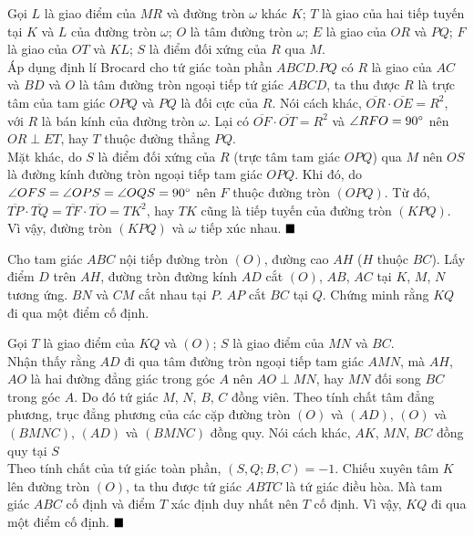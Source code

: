 \documentclass{article} %
\newenvironment{solution}[1][Lời giải]{%
  \proof[\faPenNib \hspace{0.2cm} \ttfamily \scshape \large #1]%
}{\(\hfill \blacksquare\){\parfillskip0pt\par}}
\begin{document}
        \begin{solution}
            Gọi \(L\) là giao điểm của \(MR\) và đường tròn \(\omega\) khác \(K\); \(T\) là giao của hai tiếp tuyến tại \(K\) và \(L\) của đường tròn \(\omega\); \(O\) là tâm đường tròn \(\omega\); \(E\) là giao của \(OR\) và \(PQ\); \(F\) là giao của \(OT\) và \(KL\); \(S\) là điểm đối xứng của \(R\) qua \(M\).\\
            Áp dụng định lí Brocard cho tứ giác toàn phần \(ABCD.PQ\) có \(R\) là giao của \(AC\) và \(BD\) và \(O\) là tâm đường tròn ngoại tiếp tứ giác \(ABCD\), ta thu được \(R\) là trực tâm của tam giác \(OPQ\) và \(PQ\) là đối cực của \(R\). Nói cách khác, \(\overline{OR} \cdot \overline{OE} = R^2\), với \(R\) là bán kính của đường tròn \(\omega\). Lại có \(\overline{OF} \cdot \overline{OT} = R^2\) và \(\angle RFO = 90 \degree\) nên \(OR \perp ET\), hay \(T\) thuộc đường thẳng \(PQ\).\\
            Mặt khác, do \(S\) là điểm đối xứng của \(R\) (trực tâm tam giác \(OPQ\)) qua \(M\) nên \(OS\) là đường kính đường tròn ngoại tiếp tam giác \(OPQ\). Khi đó, do \(\angle OFS = \angle OPS = \angle OQS = 90 \degree\) nên \(F\) thuộc đường tròn \((OPQ)\). Từ đó, \(\overline{TP} \cdot \overline{TQ} = \overline{TF} \cdot \overline{TO} = TK^2\), hay \(TK\) cũng là tiếp tuyến của đường tròn \((KPQ)\). Vì vậy, đường tròn \((KPQ)\) và \(\omega\) tiếp xúc nhau.
        \end{solution}

        \begin{problem}
            Cho tam giác \(ABC\) nội tiếp đường tròn \((O)\), đường cao \(AH\) (\(H\) thuộc \(BC\)). Lấy điểm \(D\) trên \(AH\), đường tròn đường kính \(AD\) cắt \((O)\), \(AB\), \(AC\) tại \(K\), \(M\), \(N\) tương ứng. \(BN\) và \(CM\) cắt nhau tại \(P\). \(AP\) cắt \(BC\) tại \(Q\). Chứng minh rằng \(KQ\) đi qua một điểm cố định.
        \end{problem}

        \begin{solution}
            Gọi \(T\) là giao điểm của \(KQ\) và \((O)\); \(S\) là giao điểm của \(MN\) và \(BC\).\\
            Nhận thấy rằng \(AD\) đi qua tâm đường tròn ngoại tiếp tam giác \(AMN\), mà \(AH\), \(AO\) là hai đường đẳng giác trong góc \(A\) nên \(AO \perp MN\), hay \(MN\) đối song \(BC\) trong góc \(A\). Do đó tứ giác \(M\), \(N\), \(B\), \(C\) đồng viên. Theo tính chất tâm đẳng phương, trục đẳng phương của các cặp đường tròn \((O)\) và \((AD)\), \((O)\) và \((BMNC)\), \((AD)\) và \((BMNC)\) đồng quy. Nói cách khác, \(AK\), \(MN\), \(BC\) đồng quy tại \(S\)\\
            Theo tính chất của tứ giác toàn phần, \((S,Q;B,C) = -1\). Chiếu xuyên tâm \(K\) lên đường tròn \((O)\), ta thu được tứ giác \(ABTC\) là tứ giác điều hòa. Mà tam giác \(ABC\) cố định và điểm \(T\) xác định duy nhất nên \(T\) cố định. Vì vậy, \(KQ\) đi qua một điểm cố định.
        \end{solution}
\end{document}
